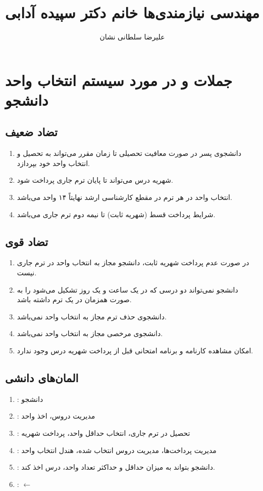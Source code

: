 \documentclass[a4paper]{article}
\title{مهندسی نیازمندی‌ها خانم دکتر سپیده آدابی}
\author{علیرضا سلطانی نشان}
\begin{document}
\maketitle
\section*{جملات  و  در مورد سیستم
انتخاب واحد دانشجو}

\subsection*{تضاد ضعیف}

\begin{enumerate}
    \item دانشجوی پسر در صورت معافیت تحصیلی تا زمان مقرر می‌تواند به تحصیل و
    انتخاب واحد خود بپردازد.
    \item شهریه درس می‌تواند تا پایان ترم جاری پرداخت شود.
    \item انتخاب واحد در هر ترم در مقطع کارشناسی ارشد نهایتاً ۱۴ واحد می‌باشد.
    \item شرایط پرداخت قسط (شهریه ثابت) تا نیمه دوم ترم جاری می‌باشد.
\end{enumerate}

\subsection*{تضاد قوی}

\begin{enumerate}
    \item در صورت عدم پرداخت شهریه ثابت، دانشجو مجاز به انتخاب واحد در ترم جاری
    نیست.
    \item دانشجو نمی‌تواند دو درسی که در یک ساعت و یک روز تشکیل می‌شود را به
    صورت همزمان در یک ترم داشته باشد.
    \item دانشجوی حذف ترم مجاز به انتخاب واحد نمی‌باشد.
    \item دانشجوی مرخصی مجاز به انتخاب واحد نمی‌باشد.
    \item امکان مشاهده کارنامه و برنامه امتحانی قبل از پرداخت شهریه درس وجود
    ندارد.
\end{enumerate}

\subsection*{المان‌های دانشی}

\begin{enumerate}
    \item {}: دانشجو
    \item {}: مدیریت دروس، اخذ واحد
    \item {}: تحصیل در ترم جاری، انتخاب حداقل واحد، پرداخت شهریه
    \item {}: مدیریت پرداخت‌ها، مدیریت دروس انتخاب شده، هندل انتخاب واحد
    \item {}: دانشجو بتواند به میزان حداقل و حداکثر تعداد واحد،
    درس اخذ کند.
    \item {}:  $\leftarrow$
\end{enumerate}
\end{document}

